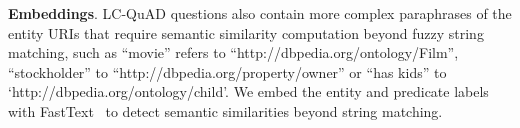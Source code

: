 \textbf{Embeddings}. LC-QuAD questions also contain more complex paraphrases of the entity URIs that require semantic similarity computation beyond fuzzy string matching, such as ``movie'' refers to ``http://dbpedia.org/ontology/Film'', ``stockholder'' to ``http://dbpedia.org/property/owner'' or ``has kids'' to `http://dbpedia.org/ontology/child'.
We embed the entity and predicate labels with FastText~\cite{} to detect semantic similarities beyond string matching.



















